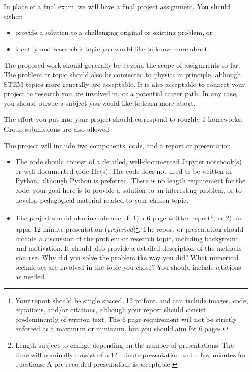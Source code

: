 \documentclass[]{homework}
\begin{document}
\project

In place of a final exam, we will have a final project assignment. You should either:
\begin{itemize}
\item provide a solution to a challenging original or existing problem, or
\item identify and research a topic you would like to know more about.
\end{itemize}
The proposed work should generally be beyond the scope of assignments so far. The problem or topic should also be connected to physics in principle, although STEM topics more generally are acceptable. It is also acceptable to connect your project to research you are involved in, or a potential career path. In any case, you should pursue a subject you would like to learn more about.

The effort you put into your project should correspond to roughly 3 homeworks.
Group submissions are also allowed.

The project will include two components: code, and a report or presentation.

\begin{itemize}
  \item The code should consist of a detailed, well-documented Jupyter notebook(s) or
well-documented code file(s). The code does not need to be written in Python, although
Python is preferred. There is no length requirement for the code: your goal
here is to provide a solution to an interesting problem, or to develop pedagogical
material related to your chosen topic.
  \item The project should also include one of: 1) a 6-page written report\footnote{Your report should be single spaced, 12 pt font, and can include images, code, equations, and/or citations, although your report should consist predominantly of written text. The 6 page requirement will not be strictly enforced as a maximum or minimum, but you should aim for 6 pages.}, or 2) an appx. 12-minute presentation ({\em preferred})\footnote{Length subject to change depending on the number of presentations. The time will nominally consist of a 12 minute presentation and a few minutes for questions. A pre-recorded presentation is acceptable.}.
The report or presentation should include a discussion of the problem or research topic, including background and motivation. It should also provide a detailed description of the methods you use. Why did you solve the problem the way you did? What numerical techniques are involved in the topic you chose? You should include citations as needed.
\end{itemize}
\end{document}
